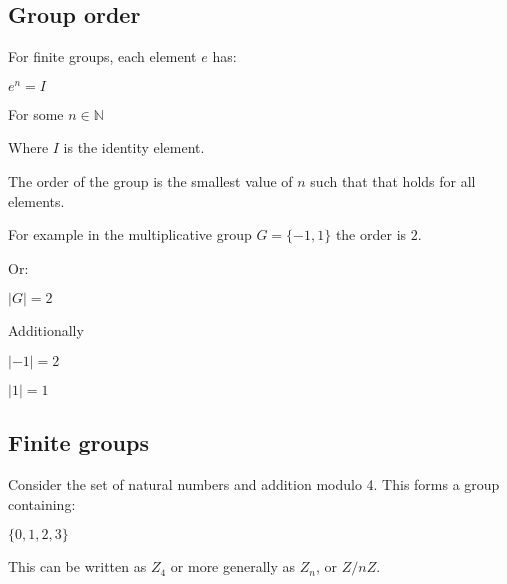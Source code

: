 
\subsection{Group order}

For finite groups, each element \(e\) has:

\(e^n=I\)

For some \(n\in \mathbb{N}\)

Where \(I\) is the identity element.

The order of the group is the smallest value of \(n\) such that that holds for all elements.

For example in the multiplicative group \(G=\{-1,1\}\) the order is \(2\).

Or:

\(|G|=2\)

Additionally

\(|-1|=2\)

\(|1|=1\)


\subsection{Finite groups}

Consider the set of natural numbers and addition modulo 4. This forms a group containing:

\(\{0,1,2,3\}\)

This can be written as \(Z_4\) or more generally as \(Z_n\), or \(Z/nZ\).

